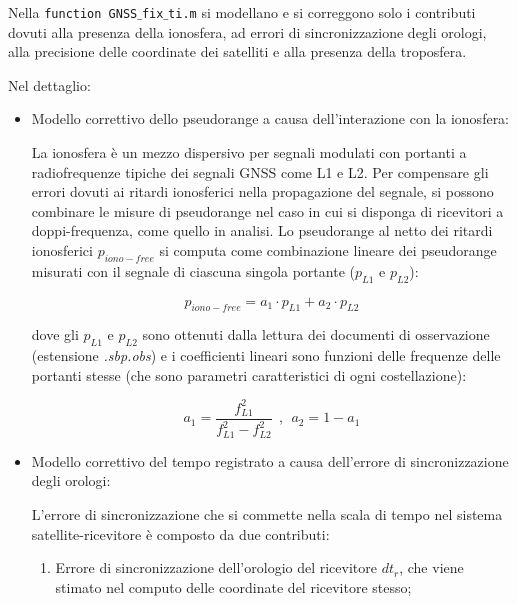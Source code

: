 \documentclass[a4paper,11pt,twoside]{book}
\begin{document}
	Nella \texttt{function GNSS$\_$fix$\_$ti.m} si modellano e si correggono solo i contributi dovuti alla presenza della ionosfera, ad errori di sincronizzazione degli orologi, alla precisione delle coordinate dei satelliti e alla presenza della troposfera.
	
	Nel dettaglio:
	
	\begin{itemize}[-]
		
		\item Modello correttivo dello pseudorange a causa dell'interazione con la ionosfera:
		
		La ionosfera è un mezzo dispersivo per segnali modulati con portanti a radiofrequenze tipiche dei segnali GNSS come L1 e L2. Per compensare gli errori dovuti ai ritardi ionosferici nella propagazione del segnale, si possono combinare le misure di pseudorange nel caso in cui si disponga di ricevitori a doppi-frequenza, come quello in analisi. Lo pseudorange al netto dei ritardi ionosferici $p_{iono-free}$ si computa come combinazione lineare dei pseudorange misurati con il segnale di ciascuna singola portante ($p_{L1}$ e $p_{L2}$):
		
		\begin{equation}
			p_{iono-free} = a_1 \cdot p_{L1} + a_2 \cdot p_{L2} 
		\end{equation}
	
		dove gli $p_{L1}$ e $p_{L2}$ sono ottenuti dalla lettura dei documenti di osservazione (estensione \textsl{.sbp.obs}) e i coefficienti lineari sono funzioni delle frequenze delle portanti stesse (che sono parametri caratteristici di ogni costellazione):
		
		\begin{equation}
			a_1 = \frac{f^2_{L1}}{f^2_{L1} - f^2_{L2}} \ \ , \ \ a_2 = 1 - a_1 
		\end{equation}
	
		\item Modello correttivo del tempo registrato a causa dell'errore di sincronizzazione degli orologi:
		
		L'errore di sincronizzazione che si commette nella scala di tempo nel sistema satellite-ricevitore è composto da due contributi:
		
		\begin{enumerate}
			\item Errore di sincronizzazione dell'orologio del ricevitore $dt_r$, che viene stimato nel computo delle coordinate del ricevitore stesso;
			

\end{enumerate}
\end{itemize}
\end{document}
